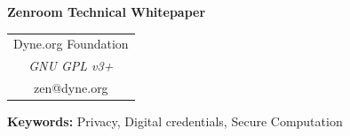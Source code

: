 \documentclass[12pt]{article}
\begin{document}
\begin{center}
    \vspace*{0.5cm}
    {\titlefont\bfseries\LARGE Zenroom Technical Whitepaper}
    \vspace{0.8cm}

    \begin{tabular}{@{}c@{}}
        Dyne.org Foundation \\
        \textit{GNU GPL v3+} \\
        zen@dyne.org
    \end{tabular}
    \vspace{1cm}
\end{center}

\begin{abstract}
\end{abstract}

\textbf{Keywords:} Privacy, Digital credentials, Secure Computation

\vspace{1cm}
\end{document}
